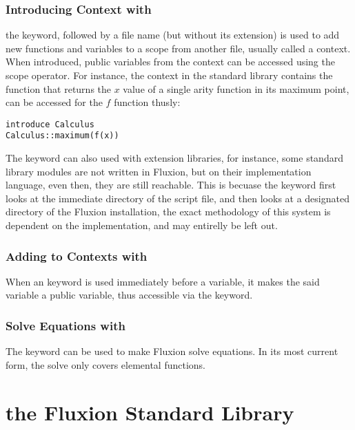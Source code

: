 \documentclass[11pt,a4paper]{book}
\begin{document}
\section{Introducing Context with }

the  keyword, followed by a file name (but without its extension) is used to add new functions and variables to a scope from another file, usually called a context.\\

When introduced, public variables from the context can be accessed using the \code{::} scope operator. For instance, the  context in the standard library contains the  function that returns the $x$ value of a single arity function in its maximum point, can be accessed for the $f$ function thusly:

\begin{lstlisting}
introduce Calculus
Calculus::maximum(f(x))
\end{lstlisting}

The  keyword can also used with extension libraries, for instance, some standard library modules are not written in Fluxion, but on their implementation language, even then, they are still reachable. This is becuase the  keyword first looks at the immediate directory of the script file, and then looks at a designated directory of the Fluxion installation, the exact methodology of this system is dependent on the implementation, and may entirelly be left out.

\section{Adding to Contexts with }

When an  keyword is used immediately before a variable, it makes the said variable a public variable, thus accessible via the  keyword.

\section{Solve Equations with }

The  keyword can be used to make Fluxion solve equations. In its most current form, the solve only covers elemental functions.

\part{the Fluxion Standard Library}
\end{document}

